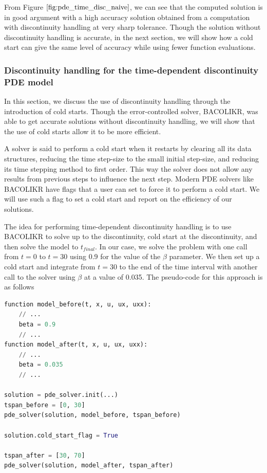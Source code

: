 \documentclass{article}
\begin{document}
From Figure $\ref{fig:pde_time_disc_naive}$, we can see that the computed solution is in good argument with a high accuracy solution obtained from a computation with discontinuity handling at very sharp tolerance. Though the solution without discontinuity handling is accurate, in the next section, we will show how a cold start can give the same level of accuracy while using fewer function evaluations.

\subsubsection{Discontinuity handling for the time-dependent discontinuity PDE model}
\label{subsubsection:pde_time_disc_hand}
In this section, we discuss the use of discontinuity handling through the introduction of cold starts. Though the error-controlled solver, BACOLIKR, was able to get accurate solutions without discontinuity handling, we will show that the use of cold starts allow it to be more efficient.

A solver is said to perform a cold start when it restarts by clearing all its data structures, reducing the time step-size to the small initial step-size, and reducing its time stepping method to first order. This way the solver does not allow any results from previous steps to influence the next step. Modern PDE solvers like BACOLIKR have flags that a user can set to force it to perform a cold start. We will use such a flag to set a cold start and report on the efficiency of our solutions.

The idea for performing time-dependent discontinuity handling is to use BACOLIKR to solve up to the discontinuity, cold start at the discontinuity, and then solve the model to $t_{final}$. In our case, we solve the problem with one call from $t=0$ to $t=30$ using 0.9 for the value of the $\beta$ parameter. We then set up a cold start and integrate from $t=30$ to the end of the time interval with another call to the solver using $\beta$ at a value of 0.035. The pseudo-code for this approach is as follows

\begin{minipage}{\linewidth}
\begin{lstlisting}[language=Python]
function model_before(t, x, u, ux, uxx):
	// ...
	beta = 0.9
	// ...
function model_after(t, x, u, ux, uxx):
	// ...
	beta = 0.035
	// ...

solution = pde_solver.init(...)
tspan_before = [0, 30]
pde_solver(solution, model_before, tspan_before)

solution.cold_start_flag = True

tspan_after = [30, 70]
pde_solver(solution, model_after, tspan_after)

\end{lstlisting}
\end{minipage}
\end{document}
